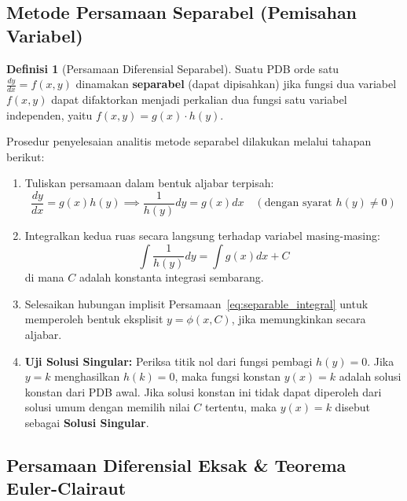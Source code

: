 \documentclass[11pt,a4paper]{article}
\theoremstyle{definition}
\newtheorem{definition}{Definisi}[section]
\begin{document}
\subsection{Metode Persamaan Separabel (Pemisahan Variabel)}

\begin{definition}[Persamaan Diferensial Separabel]
Suatu PDB orde satu $\frac{dy}{dx} = f(x,y)$ dinamakan \textbf{separabel} (dapat dipisahkan) jika fungsi dua variabel $f(x,y)$ dapat difaktorkan menjadi perkalian dua fungsi satu variabel independen, yaitu $f(x,y) = g(x) \cdot h(y)$.
\end{definition}

Prosedur penyelesaian analitis metode separabel dilakukan melalui tahapan berikut:
\begin{enumerate}[leftmargin=*]
    \item Tuliskan persamaan dalam bentuk aljabar terpisah:
    \begin{equation}
        \frac{dy}{dx} = g(x) h(y) \implies \frac{1}{h(y)} dy = g(x) dx \quad (\text{dengan syarat } h(y) \neq 0)
    \end{equation}
    \item Integralkan kedua ruas secara langsung terhadap variabel masing-masing:
    \begin{equation}
        \int \frac{1}{h(y)} dy = \int g(x) dx + C
        \label{eq:separable_integral}
    \end{equation}
    di mana $C$ adalah konstanta integrasi sembarang.
    \item Selesaikan hubungan implisit Persamaan~\eqref{eq:separable_integral} untuk memperoleh bentuk eksplisit $y = \phi(x, C)$, jika memungkinkan secara aljabar.
    \item \textbf{Uji Solusi Singular:} Periksa titik nol dari fungsi pembagi $h(y) = 0$. Jika $y = k$ menghasilkan $h(k) = 0$, maka fungsi konstan $y(x) = k$ adalah solusi konstan dari PDB awal. Jika solusi konstan ini tidak dapat diperoleh dari solusi umum dengan memilih nilai $C$ tertentu, maka $y(x) = k$ disebut sebagai \textbf{Solusi Singular}.
\end{enumerate}

\subsection{Persamaan Diferensial Eksak \& Teorema Euler-Clairaut}
\end{document}

